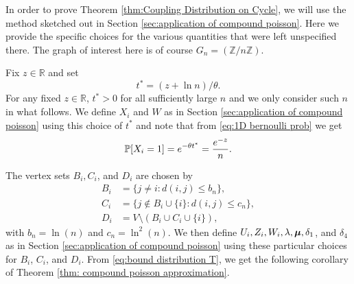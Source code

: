 	In order to prove Theorem \ref{thm:Coupling Distribution on Cycle}, we will use the method sketched out in Section \ref{sec:application of compound poisson}. Here we provide the specific choices for the various quantities that were left unspecified there. The graph of interest here is of course $G_n = (\mathbb{Z} / n \mathbb{Z})$.

	Fix $z \in \mathbb{R}$ and set 
	\begin{equation}
		t^* = (z + \ln n)/\theta.
	\end{equation}
	For any fixed $z \in \mathbb{R}$, $t^* > 0$ for all sufficiently large $n$ and we only consider such $n$ in what follows. We define $X_i$ and $W$ as in Section \ref{sec:application of compound poisson} using this choice of $t^*$ and note that from \eqref{eq:1D bernoulli prob} we get
	\begin{equation}
		\label{eq:1D prob X_i}
		\mathbb{P}[X_i = 1] = e^{-\theta t^*} = \frac{e^{-z}}{n}.
	\end{equation}

	The vertex sets $B_i, C_i$, and $D_i$ are chosen by
	\begin{align}
		B_i &= \{j\neq i : d(i,j) \leq b_n \},\\
		C_i &= \{j\notin B_i\cup \{i\}: d(i,j) \leq c_n\},\\
		D_i &= V \setminus (B_i \cup C_i \cup \{i\}),
	\end{align}
	with $b_n = \ln(n)$ and $c_n = \ln^2(n)$. We then define $U_i, Z_i, W_i, \lambda, {\bm{{\mu}}}, \delta_1$, and $\delta_4$ as in Section \ref{sec:application of compound poisson} using these particular choices for $B_i$, $C_i$, and $D_i$. From \eqref{eq:bound distribution T}, we get the following corollary of Theorem \ref{thm: compound poisson approximation}.



